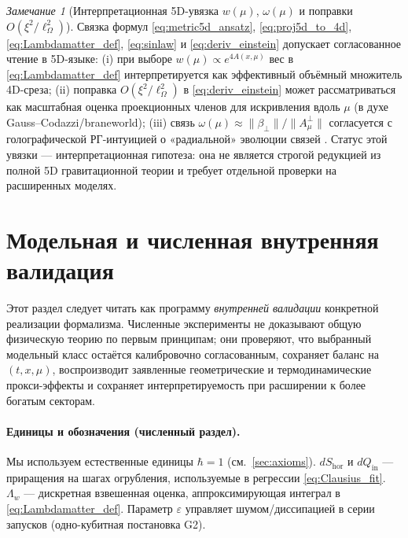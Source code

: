 \documentclass[11pt,a4paper]{article}
\theoremstyle{definition}
\theoremstyle{plain}
\theoremstyle{remark}
\newtheorem{remark}{Замечание}[section]
\begin{document}
\begin{remark}[Интерпретационная 5D-увязка $w(\mu)$, $\omega(\mu)$ и поправки $O(\xi^2/\ell_\Omega^2)$]\label{rem:5d_bridge}
Связка формул \eqref{eq:metric5d_ansatz}, \eqref{eq:proj5d_to_4d}, \eqref{eq:Lambdamatter_def},
\eqref{eq:sinlaw} и \eqref{eq:deriv_einstein} допускает согласованное чтение в 5D-языке:
(i) при выборе $w(\mu)\propto e^{4A(x,\mu)}$ вес в \eqref{eq:Lambdamatter_def}
интерпретируется как эффективный объёмный множитель 4D-среза;
(ii) поправка $O(\xi^2/\ell_\Omega^2)$ в \eqref{eq:deriv_einstein} может рассматриваться как
масштабная оценка проекционных членов для искривления вдоль $\mu$ (в духе Gauss--Codazzi/braneworld);
(iii) связь $\omega(\mu)\approx \|\beta_\perp\|/\|A_\mu^\perp\|$ согласуется с
голографической РГ-интуицией о «радиальной» эволюции связей
\cite{deBoerVerlindeVerlinde2000HolographicRG,RandallSundrum1999LargeHierarchy,RandallSundrum1999Alternative,Kim2020EmergentGeometryRG}.
Статус этой увязки --- интерпретационная гипотеза:
она не является строгой редукцией из полной 5D гравитационной теории и требует отдельной
проверки на расширенных моделях.
\end{remark}

\section{Модельная и численная внутренняя валидация}
\label{sec:numerics}

Этот раздел следует читать как программу \emph{внутренней валидации} конкретной реализации формализма.
Численные эксперименты не доказывают общую физическую теорию по первым принципам;
они проверяют, что выбранный модельный класс остаётся калибровочно согласованным,
сохраняет баланс на $(t,x,\mu)$, воспроизводит заявленные геометрические и термодинамические прокси-эффекты
и сохраняет интерпретируемость при расширении к более богатым секторам.

\paragraph{Единицы и обозначения (численный раздел).}
Мы используем естественные единицы $\hbar=1$ (см.\ \cref{sec:axioms}).
$dS_{\mathrm{hor}}$ и $dQ_{\mathrm{in}}$ — приращения на шагах огрубления, используемые в регрессии \cref{eq:Clausius_fit}.
$\Lambda_w$ — дискретная взвешенная оценка, аппроксимирующая интеграл в \cref{eq:Lambdamatter_def}.
Параметр $\varepsilon$ управляет шумом/диссипацией в серии запусков (одно-кубитная постановка G2).
\end{document}
